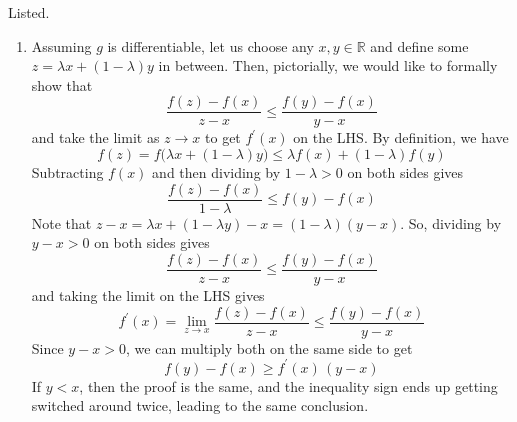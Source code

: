 \documentclass{article}
\theoremstyle{definition}
\theoremstyle{remark}
\theoremstyle{definition}
\begin{document}
  \begin{solution}
  Listed. 
  \begin{enumerate}
      \item Assuming $g$ is differentiable, let us choose any $x, y \in \mathbb{R}$ and define some $z = \lambda x + (1 - \lambda)y$ in between. Then, pictorially, we would like to formally show that 
      \[\frac{f(z) - f(x)}{z - x} \leq \frac{f(y) - f(x)}{y - x}\]
      and take the limit as $z \rightarrow x$ to get $f^\prime(x)$ on the LHS. By definition, we have 
      \[f(z) = f\big( \lambda x + (1 - \lambda) y\big) \leq \lambda f(x) + (1 - \lambda) f(y)\]
      Subtracting $f(x)$ and then dividing by $1 - \lambda > 0$ on both sides gives 
      \[\frac{f(z) - f(x)}{1 - \lambda} \leq f(y) - f(x)\] 
      Note that $z - x = \lambda x + (1 - \lambda y) - x = (1 - \lambda)(y - x)$. So, dividing by $y - x > 0$ on both sides gives 
      \[\frac{f(z) - f(x)}{z - x} \leq \frac{f(y) - f(x)}{y - x}\]
      and taking the limit on the LHS gives 
      \[f^\prime (x) = \lim_{z \rightarrow x} \frac{f(z) - f(x)}{z - x} \leq \frac{f(y) - f(x)}{y - x}\]
      Since $y - x > 0$, we can multiply both on the same side to get 
      \[f(y) - f(x) \geq f^\prime (x) \, (y - x)\]
      If $y < x$, then the proof is the same, and the inequality sign ends up getting switched around twice, leading to the same conclusion. 
      

\end{enumerate}
\end{solution}
\end{document}
